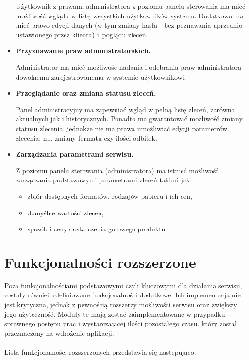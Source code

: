 \begin{itemize}
    Użytkownik z prawami administratora z poziomu panelu sterowania ma mieć możliwość wglądu w listę wszystkich użytkowników systemu. Dodatkowo ma mieć prawo edycji danych (w tym zmiany hasła - bez poznawania uprzednio ustawionego przez klienta) i~poglądu zleceń.
    \item \textbf{Przyznawanie praw administratorskich.}
    
    Administrator ma mieć możliwość nadania i odebrania praw administratora dowolnemu zarejestrowanemu w systemie użytkownikowi.
    
    \item \textbf{Przeglądanie oraz zmiana statusu zleceń.}
    
    Panel administracyjny ma zapewniać wgląd w pełną listę zleceń, zarówno aktualnych jak i historycznych. Ponadto ma gwarantować możliwość zmiany statusu zlecenia, jednakże nie ma prawa umożliwiać edycji parametrów zlecenia: np. zmiany formatu czy ilości odbitek.
    
    \item \textbf{Zarządzania parametrami serwisu.}
    
    Z poziomu panelu sterowania (administratora) ma istnieć możliwość zarządzania podstawowymi parametrami zleceń takimi jak:
    \begin{itemize}
        \item zbiór dostępnych formatów, rodzajów papieru i ich cen,
        \item domyślne wartości zleceń,
        \item sposób i ceny dostarczenia gotowego produktu.
    \end{itemize}
\end{itemize}


\section{Funkcjonalności rozszerzone}
\quad Poza funkcjonalnościami podstawowymi czyli kluczowymi dla działania serwisu, zostały również zdefiniowane funkcjonalności dodatkowe. Ich implementacja nie jest krytyczna, jednak z pewnością rozszerzy możliwości serwisu oraz zwiększy jego użyteczność. Moduły te mają zostać zaimplementowane w przypadku sprawnego postępu prac i wystarczającej ilości pozostałego czasu, który został przeznaczony na wdrożenie aplikacji.\\
\\
Lista funkcjonalności rozszerzonych przedstawia się następująco:


